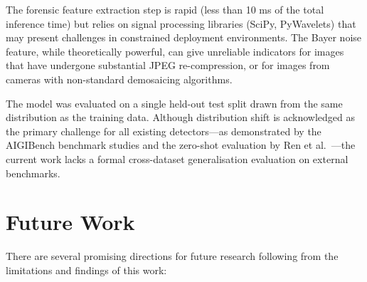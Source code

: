 The forensic feature extraction step is rapid (less than 10 ms of the total inference time) but relies on signal processing libraries (SciPy, PyWavelets) that may present challenges in constrained deployment environments. The Bayer noise feature, while theoretically powerful, can give unreliable indicators for images that have undergone substantial JPEG re-compression, or for images from cameras with non-standard demosaicing algorithms.

The model was evaluated on a single held-out test split drawn from the same distribution as the training data. Although distribution shift is acknowledged as the primary challenge for all existing detectors---as demonstrated by the AIGIBench benchmark studies \cite{li2025aigibench} and the zero-shot evaluation by Ren et al.~\cite{ren2026benchmark}---the current work lacks a formal cross-dataset generalisation evaluation on external benchmarks.

\section{Future Work}

There are several promising directions for future research following from the limitations and findings of this work:

